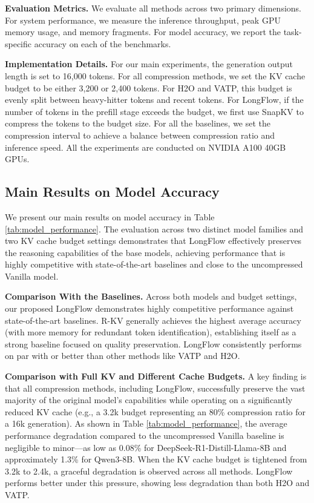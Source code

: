 \noindent\textbf{Evaluation Metrics.}
We evaluate all methods across two primary dimensions. For system performance, we measure the inference throughput, peak GPU memory usage, and memory fragments. For model accuracy, we report the task-specific accuracy on each of the benchmarks.

\noindent\textbf{Implementation Details.}
For our main experiments, the generation output length is set to 16,000 tokens. For all compression methods, we set the KV cache budget to be either 3,200 or 2,400 tokens.
For H2O and VATP, this budget is evenly split between heavy-hitter tokens and recent tokens.
For LongFlow, if the number of tokens in the prefill stage exceeds the budget, we first use SnapKV \citep{snapkv} to compress the tokens to the budget size.
For all the baselines, we set the compression interval to achieve a balance between compression ratio and inference speed.
All the experiments are conducted on NVIDIA A100 40GB GPUs.


\subsection{Main Results on Model Accuracy}

We present our main results on model accuracy in Table \ref{tab:model_performance}. The evaluation across two distinct model families and two KV cache budget settings demonstrates that LongFlow effectively preserves the reasoning capabilities of the base models, achieving performance that is highly competitive with state-of-the-art baselines and close to the uncompressed Vanilla model.

\noindent\textbf{Comparison With the Baselines.}
Across both models and budget settings, our proposed LongFlow demonstrates highly competitive performance against state-of-the-art baselines. R-KV generally achieves the highest average accuracy (with more memory for redundant token identification), establishing itself as a strong baseline focused on quality preservation. LongFlow consistently performs on par with or better than other methods like VATP and H2O. 

\noindent\textbf{Comparison with Full KV and Different Cache Budgets.}
A key finding is that all compression methods, including LongFlow, successfully preserve the vast majority of the original model's capabilities while operating on a significantly reduced KV cache (e.g., a 3.2k budget representing an 80\% compression ratio for a 16k generation).
As shown in Table \ref{tab:model_performance}, the average performance degradation compared to the uncompressed Vanilla baseline is negligible to minor—as low as 0.08\% for DeepSeek-R1-Distill-Llama-8B and approximately 1.3\% for Qwen3-8B.
When the KV cache budget is tightened from 3.2k to 2.4k, a graceful degradation is observed across all methods. LongFlow performs better under this pressure, showing less degradation than both H2O and VATP.

